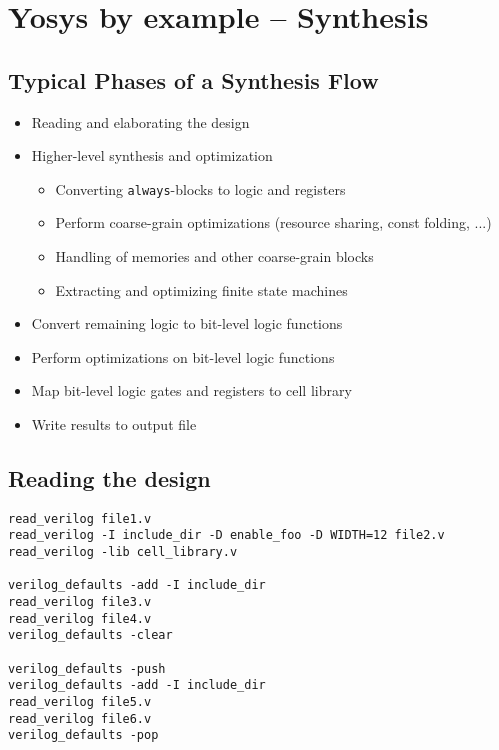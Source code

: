 
\section{Yosys by example -- Synthesis}

\begin{frame}
\sectionpage
\end{frame}


\subsection{Typical Phases of a Synthesis Flow}

\begin{frame}{\subsecname}
\begin{itemize}
\item Reading and elaborating the design
\item Higher-level synthesis and optimization
\begin{itemize}
\item Converting {\tt always}-blocks to logic and registers
\item Perform coarse-grain optimizations (resource sharing, const folding, ...)
\item Handling of memories and other coarse-grain blocks
\item Extracting and optimizing finite state machines
\end{itemize}
\item Convert remaining logic to bit-level logic functions
\item Perform optimizations on bit-level logic functions
\item Map bit-level logic gates and registers to cell library
\item Write results to output file 
\end{itemize}
\end{frame}


\subsection{Reading the design}

\begin{frame}[fragile]{\subsecname}
\begin{lstlisting}[xleftmargin=0.5cm, basicstyle=\ttfamily\fontsize{8pt}{10pt}\selectfont, language=ys]
read_verilog file1.v
read_verilog -I include_dir -D enable_foo -D WIDTH=12 file2.v
read_verilog -lib cell_library.v

verilog_defaults -add -I include_dir
read_verilog file3.v
read_verilog file4.v
verilog_defaults -clear

verilog_defaults -push
verilog_defaults -add -I include_dir
read_verilog file5.v
read_verilog file6.v
verilog_defaults -pop
\end{lstlisting}
\end{frame}

